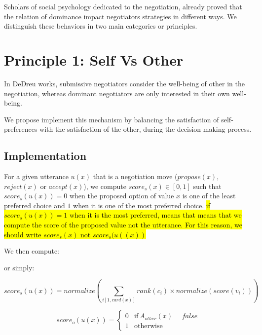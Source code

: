 \documentclass{article}
\begin{document}
	\par Scholars of social psychology dedicated to the negotiation, already proved that the relation of dominance impact negotiators strategies in different ways. We distinguish these behaviors in two main categories or principles.
	
	
	
	\section{Principle 1: Self Vs Other}
	In DeDreu works, submissive negotiators consider the well-being of other in the negotiation, whereas dominant negotiators are only interested in their own well-being. 
	
	We propose implement this mechanism by balancing the satisfaction of self-preferences with the satisfaction of the other, during the decision making process.
	
	\subsection{Implementation}
	For a given utterance $u(x)$ that is a negotiation move ($propose(x)$, $reject(x)$ or $accept(x)$), we compute $score_s(x)\in[0,1]$ such that $score_s(u(x))=0$ when the proposed option of value $x$ is one of the least preferred choice and $1$ when it is one of the most preferred choice.	\hl{if $score_s(u(x))=1$ when it is the most preferred, means that   means that we compute the score of the proposed value not the utterance. For this reason, we should write $score_s(x)$ not $score_s(u((x))$}
	
	We then compute: 
	
	
	or simply:
	
	$$score_s(u(x)) = normalize \left( \sum_{i[1,card(x)]} rank(c_i)\times normalize ( score(v_i) ) \right) $$
	 
	
	
	
	$$score_o(u(x)) = \left\{\begin{array}{ll}
	0 & \mathrm{if\ }A_{other}(x)= false\\
	1 & \mathrm{otherwise}
	\end{array}\right.$$
	
\end{document}
